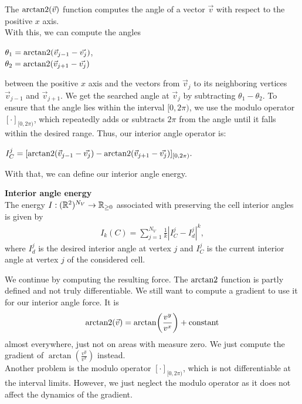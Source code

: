 The $\operatorname{arctan2}(\vec{v})$ function computes the angle of a vector $\vec{v}$ with respect to the positive $x$ axis. \\
With this, we can compute the angles 
\begin{center}
	
	$\theta_1 = \operatorname{arctan2}( \vec{v}_{j-1} - \vec{v_j} )$, \\
	$\theta_2 = \operatorname{arctan2}( \vec{v}_{j+1} - \vec{v_j} )$
	
\end{center}
between the positive $x$ axis and the vectors from $\vec{v}_j$ to its neighboring vertices $\vec{v}_{j-1}$ and $\vec{v}_{j+1}$. 
We get the searched angle at $\vec{v}_j$ by subtracting $\theta_1 - \theta_2$.
To ensure that the angle lies within the interval $[0, 2\pi)$, we use the modulo operator $[ \cdot ]_{[0,2\pi)}$, which repeatedly adds or subtracts $2\pi$ from the angle until it falls within the desired range.
Thus, our interior angle operator is: 
\begin{center}
	$
	I^j_C = [\operatorname{arctan2}(\vec{v}_{j-1} - \vec{v_j}) - \operatorname{arctan2}(\vec{v}_{j+1} - \vec{v_j})]_{[0,2\pi)}.
	$
\end{center}

With that, we can define our interior angle energy. 
\begin{definition} \textbf{Interior angle energy} \\
	The energy $I: (\mathbb{R}^2)^{N_V} \rightarrow \mathbb{R}_{\geq 0}$ associated with preserving the cell interior angles is given by
	\begin{align}
		I_k(C) = \sum\limits_{j=1}^{N_V} \frac{1}{k}| I^j_{C} - I^{j}_d |^k, 
	\end{align}
	where $I^{j}_d$ is the desired interior angle at vertex $j$ and $I^j_{C}$ is the current interior angle at vertex $j$ of the considered cell. 
\end{definition}


We continue by computing the resulting force. 
The $\operatorname{arctan2}$ function is partly defined and not truly differentiable. 
We still want to compute a gradient to use it for our interior angle force. 
It is $$\operatorname{arctan2}(\vec{v}) = \arctan\!\left(\frac{v^{y}}{v^{x}} \right) + \text{constant}$$ almost everywhere, just not on areas with measure zero. 
We just compute the gradient of $\arctan(\frac{v^{y}}{v^{x}})$ instead. \\
Another problem is the modulo operator $[ \cdot ]_{[0,2\pi)}$, which is not differentiable at the interval limits.
However, we just neglect the modulo operator as it does not affect the dynamics of the gradient.

